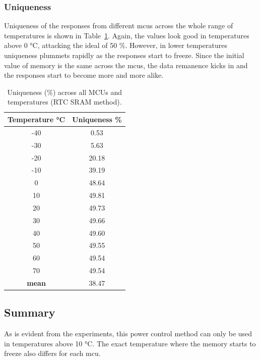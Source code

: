 \subsubsection*{Uniqueness}

Uniqueness of the responses from different \glspl{mcu} across the whole range of temperatures is shown in Table~\ref{table:uniqueness_rtc_sram}. Again, the values look good in temperatures above 0 °C, attacking the ideal of 50 \%. However, in lower temperatures uniqueness plummets rapidly as the responses start to freeze. Since the initial value of memory is the same across the \glspl{mcu}, the data remanence kicks in and the responses start to become more and more alike.

\begin{table}[ht!]
    \centering
    \begin{tabular}{cc}
    \textbf{Temperature °C} & \textbf{Uniqueness \%} \\
    \toprule
    -40  &  0.53 \\
    -30  &  5.63 \\
    -20  & 20.18 \\
    -10  & 39.19 \\
    0    & 48.64 \\
    10   & 49.81 \\
    20   & 49.73 \\
    30   & 49.66 \\
    40   & 49.60 \\
    50   & 49.55 \\
    60   & 49.54 \\
    70   & 49.54 \\
    \textbf{mean} & 38.47 \\
    \bottomrule
    \end{tabular}
    \captionsetup{justification=centering,margin=0.5cm}
    \caption{Uniqueness (\%) across all MCUs and temperatures (RTC SRAM method).}
    \label{table:uniqueness_rtc_sram}
\end{table}

\subsection{Summary}
As is evident from the experiments, this power control method can only be used in temperatures above 10 °C. The exact temperature where the memory starts to freeze also differs for each \gls{mcu}.

